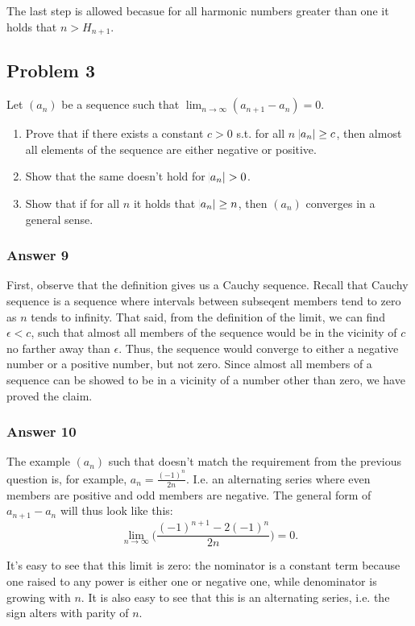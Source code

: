 \documentclass[11pt]{article}
\begin{document}
The last step is allowed becasue for all harmonic numbers greater than one
it holds that $n > H_{n+1}$.
\subsection{Problem 3}
\label{sec-1-3}
Let $(a_n)$ be a sequence such that $\lim_{n \to \infty}(a_{n+1} - a_n) = 0$.
\begin{enumerate}
\item Prove that if there exists a constant $c > 0$ s.t. for all $n$ 
$\abs{a_n}\geq c$, then almost all elements of the sequence are either
negative or positive.
\item Show that the same doesn't hold for $\abs{a_n} > 0$.
\item Show that if for all $n$ it holds that $\abs{a_n} \geq n$, then $(a_n)$
converges in a general sense.
\end{enumerate}

\subsubsection{Answer 9}
\label{sec-1-3-1}
First, observe that the definition gives us a Cauchy sequence.  Recall that
Cauchy sequence is a sequence where intervals between subseqent members tend
to zero as $n$ tends to infinity.  That said, from the definition of the
limit, we can find $\epsilon < c$, such that almost all members of the
sequence would be in the vicinity of $c$ no farther away than
$\epsilon$. Thus, the sequence would converge to either a negative number or
a positive number, but not zero.  Since almost all members of a sequence can
be showed to be in a vicinity of a number other than zero, we have proved
the claim.
\subsubsection{Answer 10}
\label{sec-1-3-2}
The example $(a_n)$ such that doesn't match the requirement from the previous
question is, for example, $a_n = \frac{(-1)^n}{2n}$.  I.e. an alternating
series where even members are positive and odd members are negative.  The
general form of $a_{n+1} - a_n$ will thus look like this:
\begin{equation*}
  \lim_{n \to \infty}\Big(\frac{(-1)^{n+1}-2(-1)^n}{2n}\Big) = 0.
\end{equation*}


It's easy to see that this limit is zero: the nominator is a constant term
because one raised to any power is either one or negative one, while
denominator is growing with $n$.  It is also easy to see that this is
an alternating series, i.e. the sign alters with parity of $n$.
\end{document}
